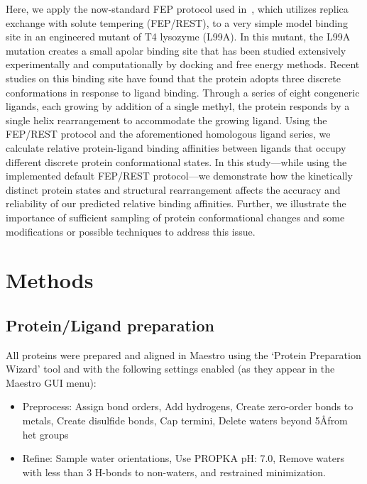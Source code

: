 \documentclass[journal=jctcce,manuscript=article]{achemso}
\begin{document}
Here, we apply the now-standard FEP protocol used in~\cite{FEPplus}, which utilizes replica exchange with solute tempering (FEP/REST)\cite{FEP/REST}, to a very simple model binding site in an engineered mutant of T4 lysozyme (L99A).
In this mutant, the L99A mutation creates a small apolar binding site that has been studied extensively experimentally\cite{eriksson1992response,eriksson1993similar,T4affinity,doi:10.1021/bi00027a007} and computationally by docking\cite{wei2002model,wei2004testing,graves2005decoys,Merski2015} and free energy methods\cite{Mobley20071118,hermans1997inclusion,boresch2003absolute,deng2006calculation,mann2000modeling,Boyce2009,FEP/REST,FEP/RESTapp}.
Recent studies on this binding site have found that the protein adopts three discrete conformations in response to ligand binding.
Through a series of eight congeneric ligands, each growing by addition of a single methyl, the protein responds by a single helix rearrangement to accommodate the growing ligand\cite{Merski2015}.
Using the FEP/REST protocol and the aforementioned homologous ligand series, we calculate relative protein-ligand binding affinities between ligands that occupy different discrete protein conformational states.
In this study---while using the implemented default FEP/REST protocol---we demonstrate how the kinetically distinct protein states and structural rearrangement affects the accuracy and reliability of our predicted relative binding affinities.
Further, we illustrate the importance of sufficient sampling of protein conformational changes and some modifications or possible techniques to address this issue.

\section{Methods}
\subsection*{Protein/Ligand preparation}
All proteins were prepared and aligned in Maestro\cite{Maestro} using the `Protein Preparation Wizard'\cite{ProteinPrepWizSoftware,Epik,Impact,Prime,ProteinPrepWizPaper} tool and with the following settings enabled (as they appear in the Maestro GUI menu):
   \begin{itemize}
   \item Preprocess: Assign bond orders, Add hydrogens, Create zero-order bonds to metals, Create disulfide bonds, Cap termini, Delete waters beyond 5\AA  from het groups
   \item Refine: Sample water orientations, Use PROPKA pH: 7.0, Remove waters with less than 3 H-bonds to non-waters, and restrained minimization.
   \end{itemize}
\end{document}

